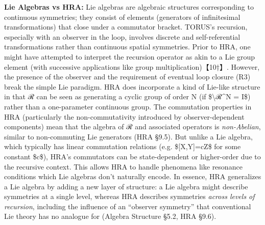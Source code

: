 \documentclass[]{article}
\begin{document}
\textbf{Lie Algebras vs HRA:} Lie algebras are algebraic structures
corresponding to continuous symmetries; they consist of elements
(generators of infinitesimal transformations) that close under a
commutator bracket. TORUS's recursion, especially with an observer in
the loop, involves discrete and self-referential transformations rather
than continuous spatial symmetries. Prior to HRA, one might have
attempted to interpret the recursion operator as akin to a Lie group
element (with successive applications like group multiplication)【10†】.
However, the presence of the observer and the requirement of eventual
loop closure (R3) break the simple Lie paradigm. HRA does incorporate a
kind of Lie-like structure in that ℛ can be seen as generating a cyclic
group of order N (if \$\textbackslash{}ℛ\^{}N = I\$) rather than a
one-parameter continuous group. The commutation properties in HRA
(particularly the non-commutativity introduced by observer-dependent
components) mean that the algebra of ℛ and associated operators is
\emph{non-Abelian}, similar to non-commuting Lie generators (HRA §9.5).
But unlike a Lie algebra, which typically has linear commutation
relations (e.g. \${[}X,Y{]}=cZ\$ for some constant \$c\$), HRA's
commutators can be state-dependent or higher-order due to the recursive
context. This allows HRA to handle phenomena like resonance conditions
which Lie algebras don't naturally encode. In essence, HRA generalizes a
Lie algebra by adding a new layer of structure: a Lie algebra might
describe symmetries at a single level, whereas HRA describes symmetries
\emph{across levels of recursion}, including the influence of an
``observer symmetry'' that conventional Lie theory has no analogue for
(Algebra Structure §5.2, HRA §9.6).
\end{document}
